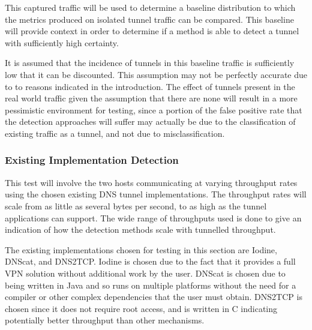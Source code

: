 \documentclass{llncs}
\begin{document}
This captured traffic will be used to determine a baseline distribution to which
the metrics produced on isolated tunnel traffic can be compared. This baseline
will provide context in order to determine if a method is able to detect a
tunnel with sufficiently high certainty.

It is assumed that the incidence of tunnels in this baseline traffic is
sufficiently low that it can be discounted. This assumption may not be perfectly
accurate due to to reasons indicated in the introduction.
The effect of tunnels present in the real world traffic given the
assumption that there are none will result in a more pessimistic environment for
testing, since
a portion of the false positive rate that the
detection approaches will suffer may actually be due to the classification of
existing traffic as a tunnel, and not due to misclassification.

\subsubsection{Existing Implementation Detection}
\label{test-existing}
This test will involve the two hosts communicating at varying throughput rates
using the chosen existing DNS tunnel implementations. The throughput rates will scale
from as little as several bytes per second, to as high as
the tunnel applications can support. The wide range of throughputs
used is done to give an indication of how the detection methods scale with
tunnelled throughput.

The existing implementations chosen for testing in this section are
Iodine\cite{iodinesrc}, DNScat\cite{dnscatsrc}, and DNS2TCP\cite{dns2tcpsrc}.
Iodine is chosen due to the fact that it provides a full VPN solution without
additional work by the user. DNScat is chosen due to being written in Java and
so runs on multiple platforms
 without the need for a compiler or
other complex dependencies that the user must obtain. DNS2TCP is chosen since it
does not require root access, and is written in C indicating potentially better
throughput than other mechanisms.
\end{document}
